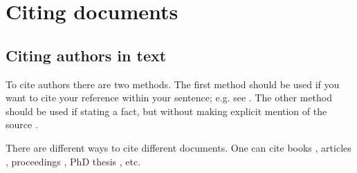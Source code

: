 \chapter{Citing documents}

\section{Citing authors in text}

To cite authors there are two methods. The first method should be used if you want to cite your reference within your sentence; e.g. see
\citet{Author2014}. The other method should be used if stating a fact, but without making explicit mention of the source \citep{Author2013}.

There are different ways to cite different documents. One can cite books \citep{Author2014}, articles \citep{Author2013}, proceedings
\citep{ConfAuthor2012}, PhD thesis \citep{Thesis2011}, etc.

